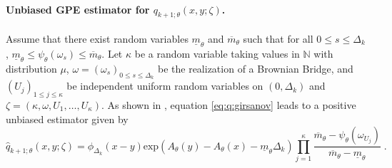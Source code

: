 \documentclass[12pt]{article}
\newcommand{\gpeUB}{\overline{m}_{\parvec}}
\newcommand{\gpeLB}{\underline{m}_{\parvec}}
\newcommand{\parvec}{\theta}
\newcommand{\hd}[1]{q_{#1}}
\newcommand{\hdhat}[1]{\widehat{q}_{#1}}
\newcommand{\eqsp}{\;}
\begin{document}
\paragraph{Unbiased GPE estimator for $\hd{k+1;\parvec}(x,y;\zeta)$.}

Assume that there exist random variables $\gpeLB$ and $\gpeUB$ such that for all $0\leqslant s \leqslant \Delta_k$, $\gpeLB \leqslant \psi_{\parvec}(\omega_s) \leqslant \gpeUB$. Let $\kappa$ be a random variable taking values in $\mathbb{N}$ with distribution $\mu$, $\omega = (\omega_s)_{0 \leq s \leq \Delta_k}$ be the realization of a Brownian Bridge, and $(U_j)_{1\leqslant j \leqslant \kappa}$ be independent uniform random
variables on $(0,\Delta_k)$ and $\zeta = (\kappa,\omega, U_1, \ldots , U_{\kappa})$. As
shown in \cite{fearnhead2008particle}, equation \eqref{eq:q:girsanov} leads to a positive unbiased estimator given by
\[
\hdhat{k+1;\parvec}(x,y;\zeta) = \phi_{\Delta_k}(x-y)\mathrm{exp}\left(A_{\parvec}(y) - A_{\parvec}(x) - \gpeLB\Delta_k\right)\prod_{j=1}^{\kappa}\frac{\gpeUB-\psi_{\parvec}(\omega_{{U_j}})}{\gpeUB-\gpeLB}\eqsp.
\]
\end{document}
